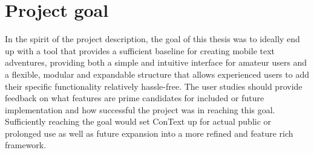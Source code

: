 \section{Project goal}
In the spirit of the project description, the goal of this thesis was to ideally end up with a tool that provides a sufficient baseline for creating mobile text adventures, providing both a simple and intuitive interface for amateur users and a flexible, modular and expandable structure that allows experienced users to add their specific functionality relatively hassle-free. 
The user studies should provide feedback on what features are prime candidates for included or future implementation and how successful the project was in reaching this goal. 
Sufficiently reaching the goal would set ConText up for actual public or prolonged use as well as future expansion into a more refined and feature rich framework. 




